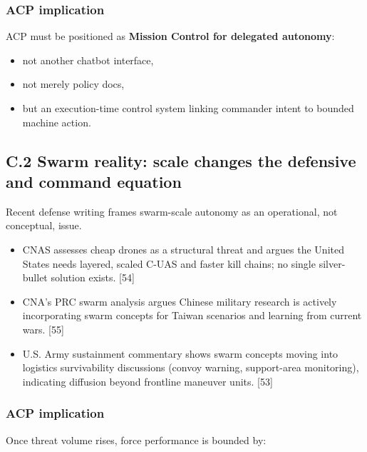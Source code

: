 \documentclass[
]{article}
\providecommand{\tightlist}{%
  \setlength{\itemsep}{0pt}\setlength{\parskip}{0pt}}
\begin{document}
\hypertarget{acp-implication}{%
\subsubsection{ACP implication}\label{acp-implication}}

ACP must be positioned as \textbf{Mission Control for delegated
autonomy}:

\begin{itemize}
\tightlist
\item
  not another chatbot interface,
\item
  not merely policy docs,
\item
  but an execution-time control system linking commander intent to
  bounded machine action.
\end{itemize}

\hypertarget{c.2-swarm-reality-scale-changes-the-defensive-and-command-equation}{%
\subsection{C.2 Swarm reality: scale changes the defensive and command
equation}\label{c.2-swarm-reality-scale-changes-the-defensive-and-command-equation}}

Recent defense writing frames swarm-scale autonomy as an operational,
not conceptual, issue.

\begin{itemize}
\tightlist
\item
  CNAS assesses cheap drones as a structural threat and argues the
  United States needs layered, scaled C-UAS and faster kill chains; no
  single silver-bullet solution exists. {[}54{]}
\item
  CNA's PRC swarm analysis argues Chinese military research is actively
  incorporating swarm concepts for Taiwan scenarios and learning from
  current wars. {[}55{]}
\item
  U.S. Army sustainment commentary shows swarm concepts moving into
  logistics survivability discussions (convoy warning, support-area
  monitoring), indicating diffusion beyond frontline maneuver units.
  {[}53{]}
\end{itemize}

\hypertarget{acp-implication-1}{%
\subsubsection{ACP implication}\label{acp-implication-1}}

Once threat volume rises, force performance is bounded by:
\end{document}
